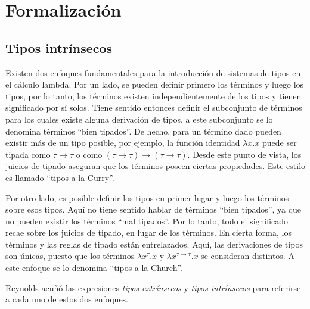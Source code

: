 \newcommand{\const}[1]{\AgdaInductiveConstructor{#1}}
\newcommand{\bound}[1]{\AgdaBound{#1}}
\newcommand{\func}[1]{\AgdaFunction{#1}}
\newcommand{\type}[1]{\AgdaDatatype{#1}}
\newcommand{\snstar}{\type{SN*}~\func{⟦\_⟧}~}
\newcommand{\cand}[1]{\func{⟦}#1\func{⟧}}
\newcommand{\pair}[2]{\const{⟨}~#1~\const{,}~#2~\const{⟩}}

\newcommand{\parens}[1]{\AgdaSymbol{(}#1\AgdaSymbol{)}}
\newcommand{\subst}[2]{\func{⟪}~#1~\func{⟫}~#2}
\newcommand{\cons}[2]{#1~\func{•}~#2}
\newcommand{\ids}{\func{ids}}
\newcommand{\comp}[2]{#1~\func{∘}~#2}


\section{Formalización}

\subsection{Tipos intrínsecos}

Existen dos enfoques fundamentales para la introducción de sistemas de tipos en el cálculo lambda.
Por un lado, se pueden definir primero los términos y luego los tipos, por lo tanto, los términos existen independientemente de los tipos y tienen significado por sí solos.
Tiene sentido entonces definir el subconjunto de términos para los cuales existe alguna derivación de tipos, a este subconjunto se lo denomina términos ``bien tipados''.
De hecho, para un término dado pueden existir más de un tipo posible, por ejemplo, la función identidad $\lambda x.x$ puede ser tipada como $\tau \rightarrow \tau$ o como $(\tau \rightarrow \tau) \rightarrow (\tau \rightarrow \tau)$.
Desde este punto de vista, los juicios de tipado aseguran que los términos poseen ciertas propiedades.
Este estilo es llamado ``tipos a la Curry''.

Por otro lado, es posible definir los tipos en primer lugar y luego los términos sobre esos tipos.
Aquí no tiene sentido hablar de términos ``bien tipados'', ya que no pueden existir los términos ``mal tipados''.
Por lo tanto, todo el significado recae sobre los juicios de tipado, en lugar de los términos.
En cierta forma, los términos y las reglas de tipado están entrelazados.
Aquí, las derivaciones de tipos son únicas, puesto que los términos $\lambda x^\tau.x$ y $\lambda x^{\tau \rightarrow \tau}.x$ se consideran distintos.
A este enfoque se lo denomina ``tipos a la Church''.

Reynolds \cite{reynolds_1998} acuñó las expresiones \textit{tipos extrínsecos} y \textit{tipos intrínsecos} para referirse a cada uno de estos dos enfoques.

